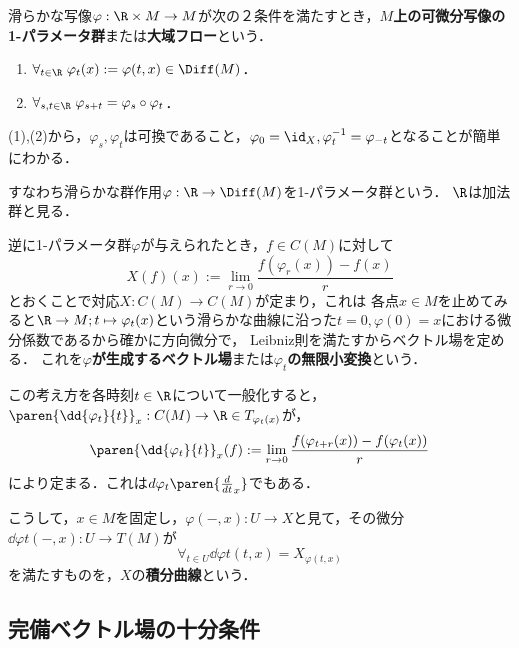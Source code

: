 \documentclass[uplatex,dvipdfmx]{jsreport}
\begin{document}
\begin{definition}
    滑らかな写像$\varphi:\R\times M\to M$が次の２条件を満たすとき，\textbf{$M$上の可微分写像の1-パラメータ群}または\textbf{大域フロー}という．
    \begin{enumerate}
        \item $\forall_{t\in\R}\;\varphi_t(x):=\varphi(t,x)\in\Diff(M)$．
        \item $\forall_{s,t\in\R}\;\varphi_{s+t}=\varphi_s\circ\varphi_t$．
    \end{enumerate}
    (1),(2)から，$\varphi_s,\varphi_t$は可換であること，$\varphi_0=\id_X,\varphi_t^{-1}=\varphi_{-t}$となることが簡単にわかる．
\end{definition}
\begin{remarks}
    すなわち滑らかな群作用$\varphi:\R\to\Diff(M)$を1-パラメータ群という．
    $\R$は加法群と見る．
\end{remarks}

\begin{definition}
    逆に1-パラメータ群$\varphi$が与えられたとき，$f\in C(M)$に対して
    \[X(f)(x):=\lim_{r\to 0}\frac{f(\varphi_r(x))-f(x)}{r}\]
    とおくことで対応$X:C(M)\to C(M)$が定まり，これは
    各点$x\in M$を止めてみると$\R\to M;t\mapsto\varphi_t(x)$という滑らかな曲線に沿った$t=0,\varphi(0)=x$における微分係数であるから確かに方向微分で，
    Leibniz則を満たすからベクトル場を定める．
    これを\textbf{$\varphi$が生成するベクトル場}または\textbf{$\varphi_t$の無限小変換}という．
\end{definition}

\begin{definition}
    この考え方を各時刻$t\in\R$について一般化すると，
    $\paren{\dd{\varphi_t}{t}}_x:C(M)\to\R\in T_{\varphi_t(x)}$が，
    \[\paren{\dd{\varphi_t}{t}}_x(f):=\lim_{r\to 0}\frac{f(\varphi_{t+r}(x))-f(\varphi_t(x))}{r}\]
    により定まる．これは$d\varphi_t\paren{\frac{d}{dt}_x}$でもある．

    こうして，$x\in M$を固定し，$\varphi(-,x):U\to X$と見て，その微分$\dd{\varphi}{t}(-,x):U\to T(M)$が
    \[\forall_{t\in U}\dd{\varphi}{t}(t,x)=X_{\varphi(t,x)}\]
    を満たすものを，$X$の\textbf{積分曲線}という．
\end{definition}

\subsection{完備ベクトル場の十分条件}
\end{document}
